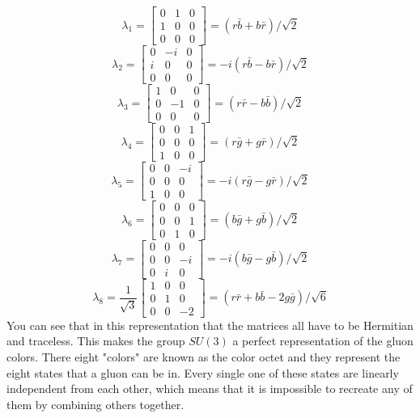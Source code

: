 \documentclass[12pt]{article}
\begin{document}
\[
\lambda_1 = \left[ \begin{matrix}
	0 & 1 & 0\\
	1 & 0 & 0\\
	0 & 0 & 0
	\end{matrix} \right] = (r\bar{b} + b\bar{r})/\sqrt{2}
\]\[
\lambda_2 = \left[ \begin{matrix}
	0 & -i & 0\\
	i & 0 & 0\\
	0 & 0 & 0
	\end{matrix} \right] = -i(r\bar{b} - b\bar{r})/\sqrt{2}
\]\[
\lambda_3 = \left[ \begin{matrix}
	1 & 0 & 0\\
	0 & -1 & 0\\
	0 & 0 & 0
	\end{matrix} \right] = (r\bar{r} - b\bar{b})/\sqrt{2}
\]\[
\lambda_4 = \left[ \begin{matrix}
	0 & 0 & 1\\
	0 & 0 & 0\\
	1 & 0 & 0
	\end{matrix} \right] = (r\bar{g} + g\bar{r})/\sqrt{2}
\]\[
\lambda_5 = \left[ \begin{matrix}
	0 & 0 & -i\\
	0 & 0 & 0\\
	1 & 0 & 0
	\end{matrix} \right] = -i(r\bar{g} - g\bar{r})/\sqrt{2}
\]\[
\lambda_6 = \left[ \begin{matrix}
	0 & 0 & 0\\
	0 & 0 & 1\\
	0 & 1 & 0
	\end{matrix} \right] = (b\bar{g} + g\bar{b})/\sqrt{2}
\]\[
\lambda_7 = \left[ \begin{matrix}
	0 & 0 & 0\\
	0 & 0 & -i\\
	0 & i & 0
	\end{matrix} \right] = -i(b\bar{g} - g\bar{b})/\sqrt{2}
\]\[
\lambda_8 = \frac{1}{\sqrt{3}}\left[ \begin{matrix}
	1 & 0 & 0\\
	0 & 1 & 0\\
	0 & 0 & -2
	\end{matrix} \right] = (r\bar{r} + b\bar{b} - 2g\bar{g})/\sqrt{6}
\]
You can see that in this representation that the matrices all have to be Hermitian and traceless. This makes the group $SU(3)$ a perfect representation of the gluon colors. There eight "colors" are known as the color octet and they represent the eight states that a gluon can be in. Every single one of these states are linearly independent from each other, which means that it is impossible to recreate any of them by combining others together.
\end{document}
